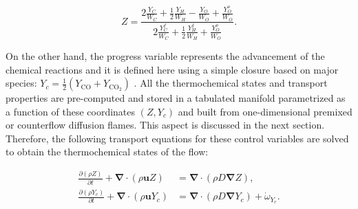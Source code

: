 \documentclass[preprint,12pt,authoryear]{elsarticle}
\begin{document}
    \begin{equation}
    \label{eq:Z_bilger_definition}
        Z = \frac{2\frac{Y_C}{W_C} + \frac{1}{2} \frac{Y_H}{W_H} - \frac{Y_O}{W_O}  + \frac{Y_O^{o}}{W_O} }{ 2\frac{Y_C^f}{W_C} + \frac{1}{2} \frac{Y_H^f}{W_H} + \frac{Y_O^{o}}{W_O} }.
    \end{equation}

On the other hand, the progress variable represents the advancement of the chemical reactions and it is defined here using a simple closure based on major species: $Y_c = \frac{1}{2} \left( Y_\mathrm{CO} + Y_\mathrm{CO_2} \right)$  \citep{fiorina_approximating_2005}. All the thermochemical states and transport properties are pre-computed and stored in a tabulated manifold parametrized as a function of these coordinates $(Z,Y_c)$ and built from one-dimensional premixed or counterflow diffusion flames. This aspect is discussed in the next section. Therefore, the following transport equations for these control variables are solved to obtain the thermochemical states of the flow:




\vspace{-15pt}


\begin{align}
\frac{\partial \left( \rho Z \right)}{\partial t} + \bm{\nabla} \cdot \left( \rho \textbf{u} Z \right) &= \bm{\nabla} \cdot \left( \rho D \bm{\nabla} Z \right),  \\
\frac{\partial \left( \rho Y_c \right)}{\partial t} + \bm{\nabla} \cdot \left( \rho \textbf{u} Y_c \right) &= \bm{\nabla} \cdot \left( \rho D \bm{\nabla} Y_c \right) + \dot{\omega}_{Y_c}.
\end{align}
\end{document}
